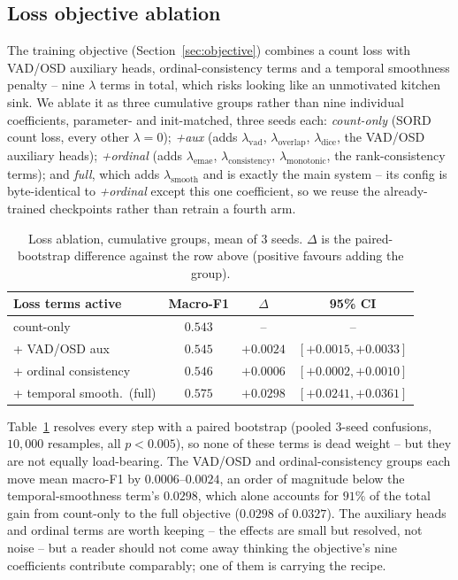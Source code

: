 \documentclass[journal]{IEEEtran}
\begin{document}
\subsection{Loss objective ablation}
\label{sec:loss-ablation}
The training objective (Section~\ref{sec:objective}) combines a count loss
with VAD/OSD auxiliary heads, ordinal-consistency terms and a temporal
smoothness penalty -- nine $\lambda$ terms in total, which risks looking
like an unmotivated kitchen sink. We ablate it as three cumulative groups
rather than nine individual coefficients, parameter- and init-matched,
three seeds each: \emph{count-only} (SORD count loss, every other
$\lambda=0$); \emph{+aux} (adds $\lambda_{\mathrm{vad}}$,
$\lambda_{\mathrm{overlap}}$, $\lambda_{\mathrm{dice}}$, the VAD/OSD
auxiliary heads); \emph{+ordinal} (adds $\lambda_{\mathrm{emae}}$,
$\lambda_{\mathrm{consistency}}$, $\lambda_{\mathrm{monotonic}}$, the
rank-consistency terms); and \emph{full}, which adds
$\lambda_{\mathrm{smooth}}$ and is exactly the main system -- its config is
byte-identical to \emph{+ordinal} except this one coefficient, so we reuse
the already-trained checkpoints rather than retrain a fourth arm.

\begin{table}[t]
\centering
\caption{Loss ablation, cumulative groups, mean of 3 seeds. $\Delta$ is the
paired-bootstrap difference against the row above (positive favours adding
the group).}
\label{tab:lossabl}
\footnotesize
\setlength{\tabcolsep}{3pt}
\begin{tabular}{lccc}
\toprule
Loss terms active & Macro-F1 & $\Delta$ & 95\% CI \\
\midrule
count-only            & $0.543$ & -- & -- \\
+ VAD/OSD aux          & $0.545$ & $+0.0024$ & $[+0.0015,+0.0033]$ \\
+ ordinal consistency  & $0.546$ & $+0.0006$ & $[+0.0002,+0.0010]$ \\
+ temporal smooth.\ (full) & $0.575$ & $+0.0298$ & $[+0.0241,+0.0361]$ \\
\bottomrule
\end{tabular}
\end{table}

Table~\ref{tab:lossabl} resolves every step with a paired bootstrap
(pooled 3-seed confusions, $10{,}000$ resamples, all $p<0.005$), so none of
these terms is dead weight -- but they are not equally load-bearing. The
VAD/OSD and ordinal-consistency groups each move mean macro-F1 by
$0.0006$--$0.0024$, an order of magnitude below the temporal-smoothness
term's $0.0298$, which alone accounts for $91\%$ of the total gain from
count-only to the full objective ($0.0298$ of $0.0327$). The auxiliary
heads and ordinal terms are worth keeping -- the effects are small but
resolved, not noise -- but a reader should not come away thinking the
objective's nine coefficients contribute comparably; one of them is
carrying the recipe.
\end{document}
